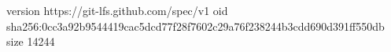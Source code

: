 version https://git-lfs.github.com/spec/v1
oid sha256:0cc3a92b9544419cac5dcd77f28f7602c29a76f238244b3cdd690d391ff550db
size 14244
